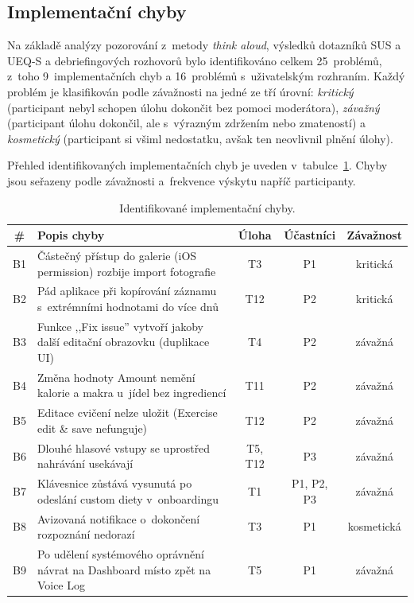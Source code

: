 \subsection{Implementační chyby}
\label{sec:identifikovaneProblemy}

Na základě analýzy pozorování z~metody \emph{think aloud}, výsledků dotazníků SUS a UEQ-S a debriefingových rozhovorů bylo identifikováno celkem 25~problémů, z~toho 9~implementačních chyb a 16~problémů s~uživatelským rozhraním.
Každý problém je klasifikován podle závažnosti na jedné ze tří úrovní: \emph{kritický} (participant nebyl schopen úlohu dokončit bez pomoci moderátora), \emph{závažný} (participant úlohu dokončil, ale s~výrazným zdržením nebo zmateností) a \emph{kosmetický} (participant si všiml nedostatku, avšak ten neovlivnil plnění úlohy).

Přehled identifikovaných implementačních chyb je uveden v~tabulce~\ref{tab:bugy}.
Chyby jsou seřazeny podle závažnosti a~frekvence výskytu napříč participanty.

\begin{table}[ht]
	\centering
	\caption{Identifikované implementační chyby.}
	\label{tab:bugy}
	\small
	\begin{tabularx}{\textwidth}{@{}c X c c c@{}}
		\toprule
		\textbf{\#} & \textbf{Popis chyby} & \textbf{Úloha} & \textbf{Účastníci} & \textbf{Závažnost} \\
		\midrule
		B1 & Částečný přístup do galerie (iOS permission) rozbije import fotografie & T3 & P1 & kritická \\
		B2 & Pád aplikace při kopírování záznamu s~extrémními hodnotami do více dnů & T12 & P2 & kritická \\
		B3 & Funkce ,,Fix issue'' vytvoří jakoby další editační obrazovku (duplikace UI) & T4 & P2 & závažná \\
		B4 & Změna hodnoty Amount nemění kalorie a makra u~jídel bez ingrediencí & T11 & P2 & závažná \\
		B5 & Editace cvičení nelze uložit (Exercise edit \& save nefunguje) & T12 & P2 & závažná \\
		B6 & Dlouhé hlasové vstupy se uprostřed nahrávání usekávají & T5, T12 & P3 & závažná \\
		B7 & Klávesnice zůstává vysunutá po odeslání custom diety v~onboardingu & T1 & P1, P2, P3 & závažná \\
		B8 & Avizovaná notifikace o~dokončení rozpoznání nedorazí & T3 & P1 & kosmetická \\
		B9 & Po udělení systémového oprávnění návrat na Dashboard místo zpět na Voice Log & T5 & P1 & závažná \\
		\bottomrule
	\end{tabularx}
\end{table}


